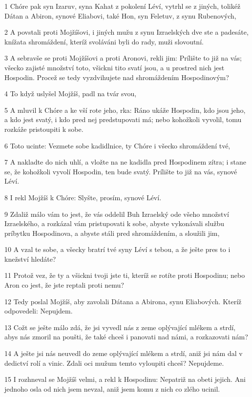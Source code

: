 \par 1 Chóre pak syn Izaruv, syna Kahat z pokolení Léví, vytrhl se z jiných, tolikéž Dátan a Abiron, synové Eliabovi, také Hon, syn Feletuv, z synu Rubenových,
\par 2 A povstali proti Mojžíšovi, i jiných mužu z synu Izraelských dve ste a padesáte, knížata shromáždení, kteríž svoláváni byli do rady, muži slovoutní.
\par 3 A sebravše se proti Mojžíšovi a proti Aronovi, rekli jim: Prílište to již na vás; všecko zajisté množství toto, všickni tito svatí jsou, a u prostred nich jest Hospodin. Procež se tedy vyzdvihujete nad shromáždením Hospodinovým?
\par 4 To když uslyšel Mojžíš, padl na tvár svou,
\par 5 A mluvil k Chóre a ke vší rote jeho, rka: Ráno ukáže Hospodin, kdo jsou jeho, a kdo jest svatý, i kdo pred nej predstupovati má; nebo kohožkoli vyvolil, tomu rozkáže pristoupiti k sobe.
\par 6 Toto ucinte: Vezmete sobe kadidlnice, ty Chóre i všecko shromáždení tvé,
\par 7 A nakladte do nich uhlí, a vložte na ne kadidla pred Hospodinem zítra; i stane se, že kohožkoli vyvolí Hospodin, ten bude svatý. Prílište to již na vás, synové Léví.
\par 8 I rekl Mojžíš k Chóre: Slyšte, prosím, synové Léví.
\par 9 Zdaliž málo vám to jest, že vás oddelil Buh Izraelský ode všeho množství Izraelského, a rozkázal vám pristupovati k sobe, abyste vykonávali službu príbytku Hospodinova, a abyste stáli pred shromáždením, a sloužili jim,
\par 10 A vzal te sobe, a všecky bratrí tvé syny Léví s tebou, a že ješte pres to i knežství hledáte?
\par 11 Protož vez, že ty a všickni tvoji jste ti, kteríž se rotíte proti Hospodinu; nebo Aron co jest, že jste reptali proti nemu?
\par 12 Tedy poslal Mojžíš, aby zavolali Dátana a Abirona, synu Eliabových. Kteríž odpovedeli: Nepujdem.
\par 13 Cožt se ješte málo zdá, že jsi vyvedl nás z zeme oplývající mlékem a strdí, abys nás zmoril na poušti, že také chceš i panovati nad námi, a rozkazovati nám?
\par 14 A ješte jsi nás neuvedl do zeme oplývající mlékem a strdí, aniž jsi nám dal v dedictví rolí a vinic. Zdali oci mužum temto vyloupiti chceš? Nepujdeme.
\par 15 I rozhneval se Mojžíš velmi, a rekl k Hospodinu: Nepatriž na obeti jejich. Ani jednoho osla od nich jsem nevzal, aniž jsem komu z nich co zlého ucinil.
